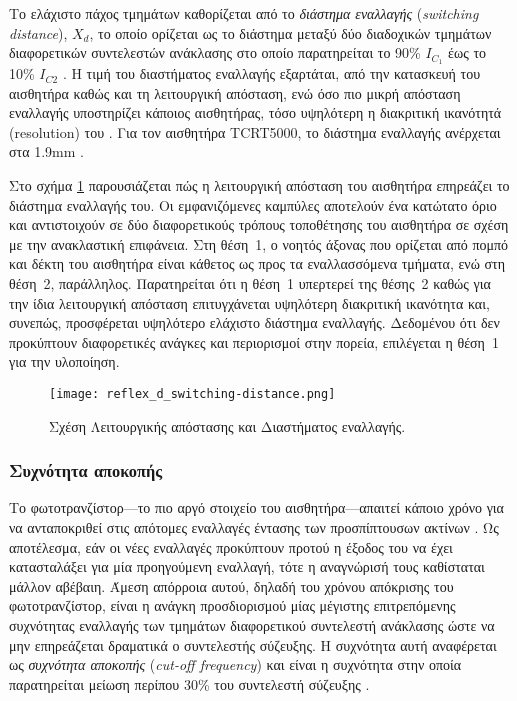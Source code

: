 Το ελάχιστο πάχος τμημάτων καθορίζεται από το
\emph{διάστημα εναλλαγής} (\emph{switching distance}),
$X_d$, το οποίο ορίζεται ως το διάστημα μεταξύ δύο διαδοχικών τμημάτων
διαφορετικών συντελεστών ανάκλασης στο οποίο παρατηρείται το 90\% $I_{C_1}$ έως
το 10\% $I_{C2}$ \parencite{vishay06}. Η τιμή του διαστήματος εναλλαγής
εξαρτάται, από την κατασκευή του αισθητήρα καθώς και τη λειτουργική απόσταση,
ενώ όσο πιο μικρή απόσταση εναλλαγής υποστηρίζει κάποιος αισθητήρας, τόσο
υψηλότερη η διακριτική ικανότητά (resolution) του
\parencites{vishay02}{vishay06}. Για τον αισθητήρα TCRT5000, το διάστημα
εναλλαγής ανέρχεται στα 1.9mm \parencite{vishay02}.

Στο σχήμα \ref{fig:reflex:d_switching-distance} παρουσιάζεται πώς η λειτουργική
απόσταση του αισθητήρα επηρεάζει το διάστημα εναλλαγής του. Οι εμφανιζόμενες
καμπύλες αποτελούν ένα κατώτατο όριο και αντιστοιχούν σε δύο διαφορετικούς
τρόπους τοποθέτησης του αισθητήρα σε σχέση με την ανακλαστική επιφάνεια.
Στη θέση~1, ο νοητός άξονας που ορίζεται από πομπό και δέκτη του αισθητήρα είναι
κάθετος ως προς τα εναλλασσόμενα τμήματα, ενώ στη θέση~2, παράλληλος.
Παρατηρείται ότι η θέση~1 υπερτερεί της θέσης~2 καθώς για την ίδια λειτουργική
απόσταση επιτυγχάνεται υψηλότερη διακριτική ικανότητα και, συνεπώς, προσφέρεται
υψηλότερο ελάχιστο διάστημα εναλλαγής. Δεδομένου ότι δεν προκύπτουν διαφορετικές
ανάγκες και περιορισμοί στην πορεία, επιλέγεται η θέση~1 για την υλοποίηση.

\begin{figure}
    \caption{Σχέση Λειτουργικής απόστασης και Διαστήματος εναλλαγής.
    \label{fig:reflex:d_switching-distance}}
    \begin{center}%
    \texttt{[image: reflex\_d\_switching-distance.png]}%
    \end{center}

\end{figure}



\subsubsection{Συχνότητα αποκοπής}

Το φωτοτρανζίστορ---το πιο αργό στοιχείο του αισθητήρα---απαιτεί κάποιο χρόνο
για να ανταποκριθεί στις απότομες εναλλαγές έντασης των προσπίπτουσων ακτίνων
\parencite{vishay06}. Ως αποτέλεσμα, εάν οι νέες εναλλαγές προκύπτουν προτού η
έξοδος του να έχει κατασταλάξει για μία προηγούμενη εναλλαγή, τότε η αναγνώρισή
τους καθίσταται μάλλον αβέβαιη. Άμεση απόρροια αυτού, δηλαδή του χρόνου
απόκρισης του φωτοτρανζίστορ, είναι η ανάγκη προσδιορισμού μίας μέγιστης
επιτρεπόμενης συχνότητας εναλλαγής των τμημάτων διαφορετικού συντελεστή
ανάκλασης ώστε να μην επηρεάζεται δραματικά ο συντελεστής σύζευξης. Η συχνότητα
αυτή αναφέρεται ως \emph{συχνότητα αποκοπής} 
(\emph{cut-off frequency}) και είναι η συχνότητα στην οποία παρατηρείται μείωση
περίπου 30\% του συντελεστή σύζευξης \parencite{vishay02}.

